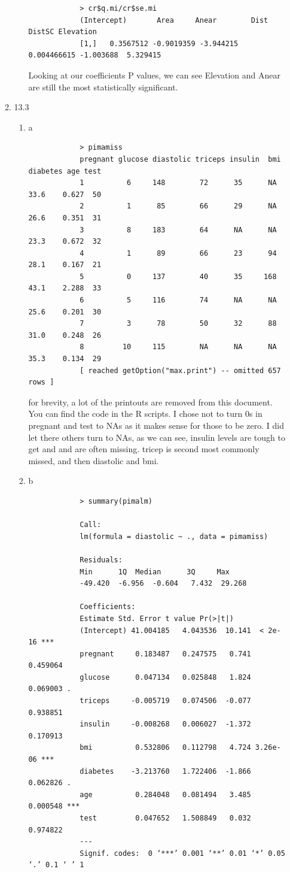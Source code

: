 \documentclass[11pt]{article}
\begin{document}
\begin{enumerate}
\begin{enumerate}
\begin{enumerate}
\begin{verbatim}
			> cr$q.mi/cr$se.mi
			(Intercept)       Area     Anear        Dist    DistSC Elevation
			[1,]   0.3567512 -0.9019359 -3.944215 0.004466615 -1.003688  5.329415
		\end{verbatim}
		Looking at our coefficients P values, we can see Elevation and Anear are still the most statistically significant.
	\end{enumerate}
	\item 13.3
	\begin{enumerate}
		\item a
		\begin{verbatim}
			> pimamiss
			pregnant glucose diastolic triceps insulin  bmi diabetes age test
			1          6     148        72      35      NA 33.6    0.627  50    
			2          1      85        66      29      NA 26.6    0.351  31    
			3          8     183        64      NA      NA 23.3    0.672  32    
			4          1      89        66      23      94 28.1    0.167  21    
			5          0     137        40      35     168 43.1    2.288  33    
			6          5     116        74      NA      NA 25.6    0.201  30    
			7          3      78        50      32      88 31.0    0.248  26   
			8         10     115        NA      NA      NA 35.3    0.134  29    
			[ reached getOption("max.print") -- omitted 657 rows ]
		\end{verbatim}
		for brevity, a lot of the printouts are removed from this document. You can find the code in the R scripts. I chose not to turn 0s in pregnant and test to NAs as it makes sense for those to be zero. I did let there others turn to NAs, as we can see, insulin levels are tough to get and and are often missing. tricep is second most commonly missed, and then diastolic and bmi.
		\item b
		\begin{verbatim}
			> summary(pimalm)
			
			Call:
			lm(formula = diastolic ~ ., data = pimamiss)
			
			Residuals:
			Min      1Q  Median      3Q     Max 
			-49.420  -6.956  -0.604   7.432  29.268 
			
			Coefficients:
			Estimate Std. Error t value Pr(>|t|)    
			(Intercept) 41.004185   4.043536  10.141  < 2e-16 ***
			pregnant     0.183487   0.247575   0.741 0.459064    
			glucose      0.047134   0.025848   1.824 0.069003 .  
			triceps     -0.005719   0.074506  -0.077 0.938851    
			insulin     -0.008268   0.006027  -1.372 0.170913    
			bmi          0.532806   0.112798   4.724 3.26e-06 ***
			diabetes    -3.213760   1.722406  -1.866 0.062826 .  
			age          0.284048   0.081494   3.485 0.000548 ***
			test         0.047652   1.508849   0.032 0.974822    
			---
			Signif. codes:  0 ‘***’ 0.001 ‘**’ 0.01 ‘*’ 0.05 ‘.’ 0.1 ‘ ’ 1
			

\end{verbatim}
\end{enumerate}
\end{enumerate}
\end{enumerate}
\end{document}

